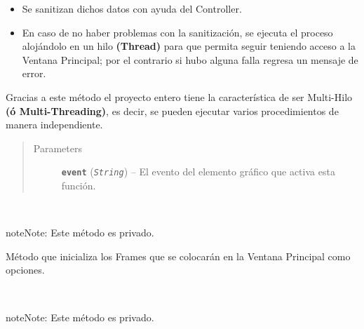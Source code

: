 \documentclass[letterpaper,10pt,english]{sphinxmanual}
\begin{document}
\begin{fulllineitems}
\begin{fulllineitems}
\begin{itemize}
\item {} 
Se sanitizan dichos datos con ayuda del Controller.

\item {} 
En caso de no haber problemas con la sanitización, se ejecuta el proceso alojándolo en un hilo \textbf{(Thread)} para que permita seguir teniendo acceso a la Ventana Principal; por el contrario si hubo alguna falla regresa un mensaje de error.

\end{itemize}

\begin{DUlineblock}{0em}
\item[] Gracias a este método el proyecto entero tiene la característica de ser Multi-Hilo \textbf{(ó Multi-Threading)}, es decir,
se pueden ejecutar varios procedimientos de manera independiente.
\end{DUlineblock}
\begin{quote}\begin{description}
\item[{Parameters}] \leavevmode
\textbf{\texttt{event}} (\emph{\texttt{String}}) -- El evento del elemento gráfico que activa esta función.

\end{description}\end{quote}

\end{fulllineitems}


\begin{fulllineitems}
\label{View/MainWindow:View.MainWindow.MainWindow._MainWindow__initialize_frames}~
\begin{notice}{note}{Note:}
Este método es privado.
\end{notice}

Método que inicializa los Frames que se 
colocarán en la Ventana Principal como opciones.

\end{fulllineitems}


\begin{fulllineitems}
\label{View/MainWindow:View.MainWindow.MainWindow._MainWindow__load_images}~
\begin{notice}{note}{Note:}
Este método es privado.
\end{notice}


\end{fulllineitems}
\end{fulllineitems}
\end{document}

